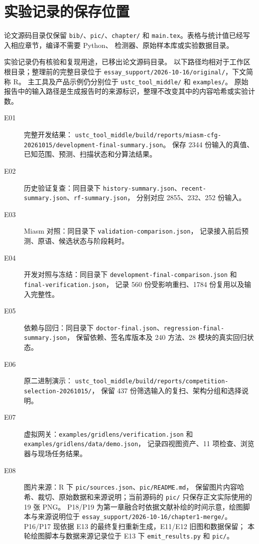 \section{实验记录的保存位置}
论文源码目录仅保留 \nolinkurl{bib/}、\nolinkurl{pic/}、\nolinkurl{chapter/} 和
\nolinkurl{main.tex}。表格与统计值已经写入相应章节，编译不需要 Python、
检测器、原始样本库或实验数据目录。

实验记录仍有核验和复现用途，已移出论文源码目录。
以下路径均相对于工作区根目录；整理前的完整目录位于
\nolinkurl{essay_support/2026-10-16/original/}，下文简称 R。
主工具及产品示例仍分别位于 \nolinkurl{ustc_tool_middle/} 和 \nolinkurl{examples/}。
原始报告中的输入路径是生成报告时的来源标识，整理不改变其中的内容哈希或实验计数。

\begin{description}
  \item[E01] 完整开发结果：
  \nolinkurl{ustc_tool_middle/build/reports/miasm-cfg-20261015/development-final-summary.json}。
  保存 2344 份输入的真值、已知范围、预测、扫描状态和分算法结果。

  \item[E02] 历史验证复查：同目录下
  \nolinkurl{history-summary.json}、\nolinkurl{recent-summary.json}、\nolinkurl{rf-summary.json}，
  分别对应 2855、232、252 份输入。

  \item[E03] Miasm 对照：同目录下 \nolinkurl{validation-comparison.json}，
  记录接入前后预测、原语、候选状态与阶段耗时。

  \item[E04] 开发对照与冻结：同目录下
  \nolinkurl{development-final-comparison.json} 和 \nolinkurl{final-verification.json}，
  记录 560 份受影响重扫、1784 份复用以及输入完整性。

  \item[E05] 依赖与回归：同目录下
  \nolinkurl{doctor-final.json}、\nolinkurl{regression-final-summary.json}，
  保留依赖、签名库版本及 240 方法、28 模块的真实回归状态。

  \item[E06] 原二进制演示：
  \nolinkurl{ustc_tool_middle/build/reports/competition-selection-20261015/}，
  保留 437 份筛选输入的复扫、架构分组和选择说明。

  \item[E07] 虚拟网关：\nolinkurl{examples/gridlens/verification.json} 和
  \nolinkurl{examples/gridlens/data/demo.json}，
  记录四视图资产、11 项检查、浏览器与现场任务结果。

  \item[E08] 图片来源：R 下 \nolinkurl{pic/sources.json}、\nolinkurl{pic/README.md}，
  保留图片内容哈希、裁切、原始数据和来源说明；当前源码的
  \nolinkurl{pic/} 只保存正文实际使用的 19 张 PNG。
  P18/P19 为第一章融合时依据文献补绘的时间示意，绘图脚本与来源说明位于
  \nolinkurl{essay_support/2026-10-16/chapter1-merge/}。
  P16/P17 现依据 E13 的最终复扫重新生成，E11/E12 旧图和数据保留；
  本轮绘图脚本与数据来源记录位于 E13 下 \nolinkurl{emit_results.py} 和 \nolinkurl{pic/}。


\end{description}
